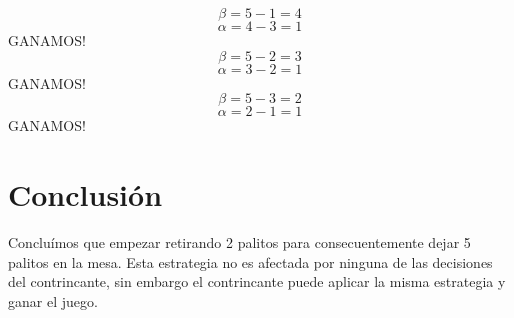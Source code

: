 \documentclass[12pt]{article}
\begin{document}
  \begin{equation}
    \label{paso4a}
    \beta = 5 - 1 = 4
  \end{equation}
  \begin{equation}
    \label{paso5a}
    \alpha = 4 - 3 = 1
  \end{equation}
  GANAMOS!
  \begin{equation}
    \label{paso4b}
    \beta = 5 - 2 = 3
  \end{equation}
  \begin{equation}
    \label{paso5b}
    \alpha = 3 - 2 = 1
  \end{equation}
  GANAMOS!
  \begin{equation}
    \label{paso4c}
    \beta = 5 - 3 = 2
  \end{equation}
  \begin{equation}
    \label{paso5c}
    \alpha = 2 - 1 = 1
  \end{equation}
  GANAMOS!

  \section{Conclusión}
  Concluímos que empezar retirando 2 palitos para consecuentemente dejar 5 palitos en la mesa. Esta estrategia no es afectada por ninguna de las decisiones del contrincante, sin embargo el contrincante puede aplicar la misma estrategia y ganar el juego.
\end{document}
